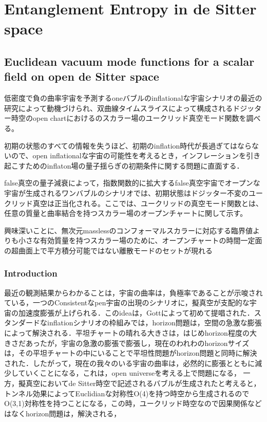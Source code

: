 \chapter{Entanglement Entropy in de Sitter space}

     
\section{Euclidean vacuum mode functions for a scalar field on open de Sitter space\cite{10}}

低密度で負の曲率宇宙を予測するoneバブルのinflationalな宇宙シナリオの最近の研究によって動機づけられ、双曲線タイムスライスによって構成されるドジッター時空のopen chartにおけるのスカラー場のユークリッド真空モード関数を調べる。

初期の状態のすべての情報を失うほど、初期のinflation時代が長過ぎてはならないので、open inflationalな宇宙の可能性を考えるとき，インフレーションを引き起こすためのinflaton場の量子揺らぎの初期条件に関する問題に直面する．

false真空の量子減衰によって，指数関数的に拡大するfalse真空宇宙でオープンな宇宙が生成されるワンバブルのシナリオでは、初期状態はドジッター不変のユークリッド真空は正当化される。ここでは、ユークリッドの真空モード関数とは、任意の質量と曲率結合を持つスカラー場のオープンチャートに関して示す。

興味深いことに、無次元masslessのコンフォーマルスカラーに対応する臨界値よりも小さな有効質量を持つスカラー場のために、オープンチャートの時間一定面の超曲面上で平方積分可能ではない離散モードのセットが現れる
\subsection{Introduction}
最近の観測結果からわかることは，宇宙の曲率は，負極率であることが示唆されている，一つのConsistentなpen宇宙の出現のシナリオに，擬真空が支配的な宇宙の加速度膨張が上げられる．このideaは，Gottによって初めて提唱された．\cite{11}スタンダードなinflationシナリオの枠組みでは，horizon問題は，空間の急激な膨張によって解決される．平坦チャートの晴れる大きさは，はじめhorizon程度の大きさだあったが，宇宙の急激の膨張で膨張し，現在のわれわのhorizonサイズは，その平坦チャートの中にいることで平坦性問題がhorizon問題と同時に解決された．したがって，現在の我々のいる宇宙の曲率は，必然的に膨張とともに減少していくことになる，これは，open universeを考える上で問題になる，
一方，擬真空においてde Sitter時空で記述されるバブルが生成されたと考えると，トンネル効果によってEuclidianな対称性O(4)を持つ時空から生成されるのでO(3,1)対称性を持つことになる，この時，ユークリッド時空なので因果関係などはなくhorizon問題は，解決される，

